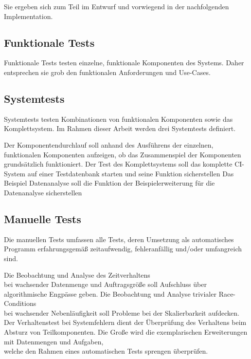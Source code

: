 Sie ergeben sich zum Teil im Entwurf und vorwiegend in
der nachfolgenden Implementation.

\subsection{Funktionale Tests}

Funktionale Tests testen einzelne, funktionale Komponenten des Systems.
Daher entsprechen sie grob den funktionalen Anforderungen und Use-Cases.

\subsection{Systemtests}

Systemtests testen Kombinationen von funktionalen Komponenten sowie das Komplettsystem.
Im Rahmen dieser Arbeit werden drei Systemtests definiert.


\begin{description}
  \dhitem[Komponentendurchlauf:]
    Der Komponentendurchlauf soll anhand des Ausführens der einzelnen, funktionalen Komponenten aufzeigen,
    ob das Zusammenspiel der Komponenten grunds\"atzlich funktioniert.
  \dhitem[Komplettstystem:]
    Der Test des Komplettsystems soll das komplette CI-System auf einer Testdatenbank starten
    und seine Funktion sicherstellen
    Das Beispiel Datenanalyse soll die Funktion der Beispielerweiterung f\"ur die Datenanalyse sicherstellen
\end{description}

\subsection{Manuelle Tests}

Die manuellen Tests umfassen alle Tests,
deren Umsetzung als automatisches Programm erfahrungsgemäß zeitaufwendig,
fehleranf\"allig und/oder umfangreich sind.

\begin{description}
    Die Beobachtung und Analyse des Zeitverhaltens \\
    bei wachsender Datenmenge und Auftragsgröße soll Aufschluss über algorithmische Engpässe geben.
    Die Beobachtung und Analyse trivialer Race-Conditions \\
    bei wachsender Nebenl\"aufigkeit soll Probleme bei der Skalierbarkeit aufdecken.
      Der Verhaltenstest bei Systemfehlern dient der
    \"Uberpr\"ufung des Verhaltens beim Absturz von Teilkomponenten.
    Die Große wird die exemplarischen Erweiterungen mit Datenmengen und Aufgaben, \\
    welche den Rahmen eines automatischen Tests sprengen überprüfen.
\end{description}


